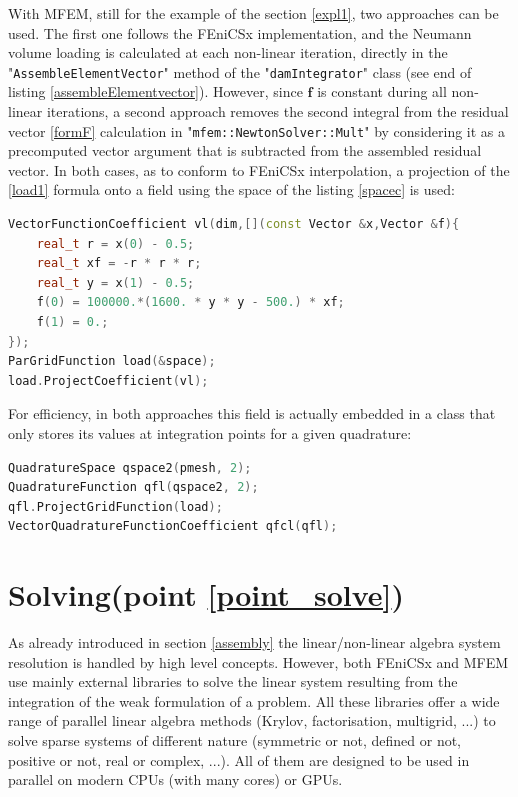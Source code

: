 \documentclass[12pt]{article}
\newcommand{\f}[1]{FEniCSx#1}
\newcommand{\vm}[1]{
	{\ensuremath{\mathbf{#1}}}
}
\newcommand{\mycode}[1]{\textsf{"}\lstinline`#1`\textsf{"}}
\begin{document}
\bigskip	
With MFEM, still for the example of the section \ref{expl1}, two approaches can be used.
The first one follows the \f{} implementation, and the Neumann volume loading is calculated at each non-linear iteration, directly in the \mycode{AssembleElementVector} method of the \mycode{damIntegrator} class (see end of listing \ref{assembleElementvector}). 
However, since $\vm{f}$ is constant during all non-linear iterations, a second approach removes the second integral from the residual vector \eqref{formF} calculation in \mycode{mfem::NewtonSolver::Mult} by considering it as a precomputed vector argument that is subtracted from the assembled residual vector.
In both cases, as to conform to \f{} interpolation, a projection of the \eqref{load1} formula onto a field using the space of the listing \ref{spacec} is used:
\begin{lstlisting}[numbers=none,basicstyle=\footnotesize,language=c++]
VectorFunctionCoefficient vl(dim,[](const Vector &x,Vector &f){
	real_t r = x(0) - 0.5;
	real_t xf = -r * r * r;
	real_t y = x(1) - 0.5;
	f(0) = 100000.*(1600. * y * y - 500.) * xf;
	f(1) = 0.;
});
ParGridFunction load(&space);
load.ProjectCoefficient(vl);
\end{lstlisting}
For efficiency, in both approaches this field is actually embedded in a class that only stores its values at integration points for a given quadrature: 
\begin{lstlisting}[numbers=none,basicstyle=\footnotesize,language=c++,label=qfcl]
QuadratureSpace qspace2(pmesh, 2);
QuadratureFunction qfl(qspace2, 2);
qfl.ProjectGridFunction(load);
VectorQuadratureFunctionCoefficient qfcl(qfl);
\end{lstlisting}


\section{Solving(point \ref{point_solve})\label{solving}}

As already introduced in section \ref{assembly} the linear/non-linear algebra system resolution is handled by high level concepts.
However, both \f{} and MFEM use mainly external libraries to solve the linear system resulting from the integration of the weak formulation of a problem. 
All these libraries offer a wide range of parallel linear algebra methods (Krylov, factorisation, multigrid, ...) to solve sparse systems of different nature (symmetric or not, defined or not, positive or not, real or complex, ...).
All of them are designed to be used in parallel on modern CPUs (with many cores) or GPUs.
\end{document}
